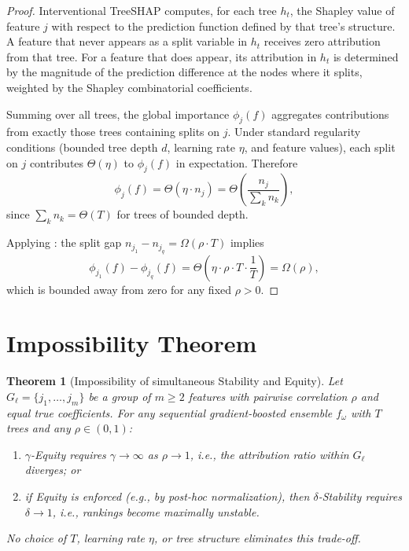 \documentclass[11pt]{article}
\newtheorem{theorem}{Theorem}
\theoremstyle{remark}
\newcommand{\Gl}{G_\ell}                    %
\newcommand{\phij}{\phi_j}                  %
\newcommand{\splits}[1]{n_{#1}}             %
\newcommand{\totalT}{T}                     %
\newcommand{\rhovar}{\rho}                  %
\begin{document}
\begin{proof}
Interventional TreeSHAP computes, for each tree $h_t$, the Shapley value
of feature $j$ with respect to the prediction function defined by that
tree's structure.  A feature that never appears as a split variable in
$h_t$ receives zero attribution from that tree.  For a feature that does
appear, its attribution in $h_t$ is determined by the magnitude of the
prediction difference at the nodes where it splits, weighted by the
Shapley combinatorial coefficients.

Summing over all trees, the global importance $\phij(f)$ aggregates
contributions from exactly those trees containing splits on $j$.
Under standard regularity conditions (bounded tree depth $d$, learning
rate $\eta$, and feature values), each split on $j$ contributes
$\Theta(\eta)$ to $\phij(f)$ in expectation.
Therefore
\begin{equation}
  \phij(f)
    = \Theta(\eta \cdot \splits{j})
    = \Theta\!\left(\frac{\splits{j}}{\sum_k \splits{k}}\right),
\end{equation}
since $\sum_k \splits{k} = \Theta(\totalT)$ for trees of bounded depth.

Applying : the split gap
$\splits{j_1} - \splits{j_q} = \Omega(\rhovar \cdot \totalT)$ implies
\begin{equation}
  \phi_{j_1}(f) - \phi_{j_q}(f)
    = \Theta\!\left(\eta \cdot \rhovar \cdot \totalT
      \cdot \frac{1}{\totalT}\right)
    = \Omega(\rhovar),
\end{equation}
which is bounded away from zero for any fixed $\rhovar > 0$.
\end{proof}


\section{Impossibility Theorem}
\label{sec:impossibility}

\begin{theorem}[Impossibility of simultaneous Stability and Equity]
\label{thm:impossibility}
Let $\Gl = \{j_1, \dots, j_m\}$ be a group of $m \geq 2$ features with
pairwise correlation $\rhovar$ and equal true coefficients.
For any sequential gradient-boosted ensemble $f_\omega$ with $\totalT$
trees and any $\rhovar \in (0,1)$:
\begin{enumerate}
  \item[(i)] $\gamma$-Equity requires $\gamma \to \infty$ as
    $\rhovar \to 1$, i.e., the attribution ratio within $\Gl$ diverges; or
  \item[(ii)] if Equity is enforced (e.g., by post-hoc normalization), then
    $\delta$-Stability requires $\delta \to 1$, i.e., rankings become
    maximally unstable.
\end{enumerate}
No choice of $\totalT$, learning rate $\eta$, or tree structure
eliminates this trade-off.
\end{theorem}
\end{document}
